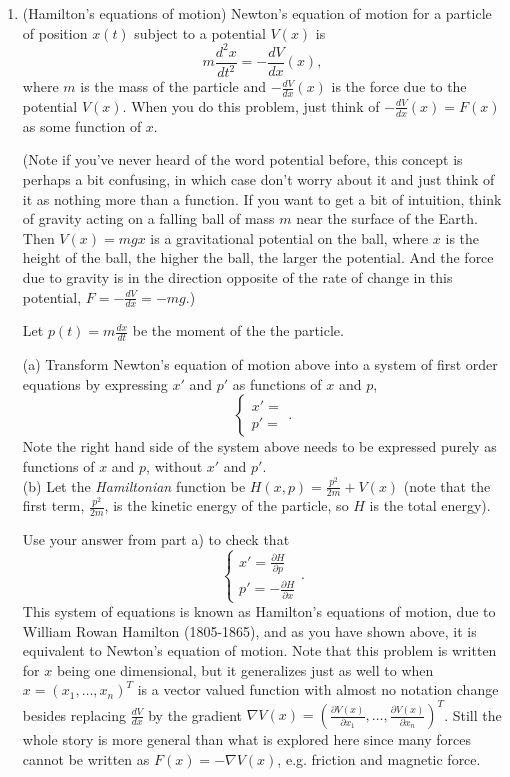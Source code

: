 \documentclass[11pt]{article}
\theoremstyle{definition}
\begin{document}
\begin{enumerate}[leftmargin=*]
\item (Hamilton's equations of motion) Newton's equation of motion for a particle of position $x(t)$ subject to a potential $V(x)$ is 
\[
m\frac{d^2x}{dt^2}=-\frac{dV}{dx}(x),
\]
where $m$ is the mass of the particle and $-\frac{dV}{dx}(x)$ is the force due to the potential $V(x)$. When you do this problem, just think of $-\frac{dV}{dx}(x)=F(x)$ as some function of $x$.    

(Note if you've never heard of the word potential before, this concept is perhaps a bit confusing, in which case don't worry about it and just think of it as nothing more than a function.  If you want to get a bit of intuition, think of gravity acting on a falling ball of mass $m$ near the surface of the Earth.  Then $V(x)=mgx$ is a gravitational potential on the ball, where $x$ is the height of the ball, the higher the ball, the larger the potential.  And the force due to gravity is in the direction opposite of the rate of change in this potential, $F=-\frac{dV}{dx}=-mg$.)

Let $p(t)=m\frac{dx}{dt}$ be the moment of the the particle.

(a) Transform Newton's equation of motion above into a system of first order equations by expressing $x'$ and $p'$ as functions of $x$ and $p$,
\[
\begin{cases}
x'=\\
p'=
\end{cases}.
\]
Note the right hand side of the system above needs to be expressed purely as functions of $x$ and $p$, without $x'$ and $p'$.  \\


(b) Let the \emph{Hamiltonian} function be $H(x,p)=\frac{p^2}{2m}+V(x)$ (note that the first term, $\frac{p^2}{2m}$, is the kinetic energy of the particle, so $H$ is the total energy).  

Use your answer from part a) to check that 
\[
\begin{cases}
x'=\frac{\partial H}{\partial p}\\
p'=-\frac{\partial H}{\partial x}
\end{cases}.
\]
This system of equations is known as Hamilton's equations of motion, due to William Rowan Hamilton (1805-1865), and as you have shown above,  it is equivalent to Newton's equation of motion.  Note that this problem is written for $x$ being one dimensional, but it generalizes just as well to when $x=(x_1,\ldots, x_n)^T$ is a vector valued function with almost no notation change besides replacing $\frac{dV}{dx}$ by the gradient $\nabla V(x)=\left(\frac{\partial V(x)}{\partial x_1},\ldots, \frac{\partial V(x)}{\partial x_n}\right)^T$.  Still the whole story is more general than what is explored here since many forces cannot be written as $F(x)=-\nabla V(x)$, e.g. friction and magnetic force.\\


\end{enumerate}
\end{document}
